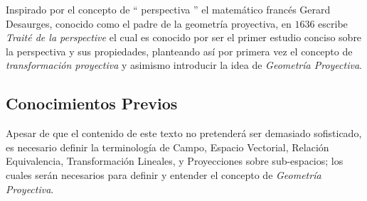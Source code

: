 \documentclass[10pt,a4paper]{article}
\begin{document}
Inspirado por el concepto de `` perspectiva '' el matemático francés Gerard Desaurges, conocido como el padre de la geometría proyectiva, en $1636$ escribe \textit{Traité de la perspective} el cual es conocido por ser el primer estudio conciso sobre la perspectiva y sus propiedades, planteando así por primera vez el concepto de \textit{transformación proyectiva} y asimismo introducir la idea de \textit{Geometría Proyectiva}.

\subsection{Conocimientos Previos}

Apesar de que el contenido de este texto no pretenderá ser demasiado sofisticado, es necesario definir la terminología de Campo,  Espacio Vectorial, Relación Equivalencia, Transformación Lineales, y Proyecciones sobre sub-espacios; los cuales serán necesarios para definir y entender el concepto de \textit{Geometría Proyectiva}. 
\end{document}
